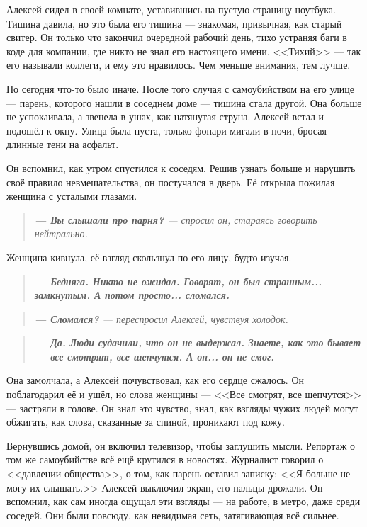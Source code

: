 \documentclass[12pt,a4paper]{book}
\newenvironment{dialogue}{\begin{quote}\itshape}{\end{quote}} %
\begin{document}
Алексей сидел в своей комнате, уставившись на пустую страницу ноутбука. Тишина давила, но это была его тишина --- знакомая, привычная, как старый свитер. Он только что закончил очередной рабочий день, тихо устраняя баги в коде для компании, где никто не знал его настоящего имени. <<Тихий>> --- так его называли коллеги, и ему это нравилось. Чем меньше внимания, тем лучше.

Но сегодня что-то было иначе. После того случая с самоубийством на его улице --- парень, которого нашли в соседнем доме --- тишина стала другой. Она больше не успокаивала, а звенела в ушах, как натянутая струна. Алексей встал и подошёл к окну. Улица была пуста, только фонари мигали в ночи, бросая длинные тени на асфальт.

Он вспомнил, как утром спустился к соседям. Решив узнать больше и нарушить своё правило невмешательства, он постучался в дверь. Её открыла пожилая женщина с усталыми глазами.

\begin{dialogue}
\textbf{--- Вы слышали про парня?} --- спросил он, стараясь говорить нейтрально.
\end{dialogue}

Женщина кивнула, её взгляд скользнул по его лицу, будто изучая.

\begin{dialogue}
\textbf{--- Бедняга. Никто не ожидал. Говорят, он был странным... замкнутым. А потом просто... сломался.}
\end{dialogue}

\begin{dialogue}
\textbf{--- Сломался?} --- переспросил Алексей, чувствуя холодок.
\end{dialogue}

\begin{dialogue}
\textbf{--- Да. Люди судачили, что он не выдержал. Знаете, как это бывает --- все смотрят, все шепчутся. А он... он не смог.}
\end{dialogue}

Она замолчала, а Алексей почувствовал, как его сердце сжалось. Он поблагодарил её и ушёл, но слова женщины --- <<Все смотрят, все шепчутся>> --- застряли в голове. Он знал это чувство, знал, как взгляды чужих людей могут обжигать, как слова, сказанные за спиной, проникают под кожу.

Вернувшись домой, он включил телевизор, чтобы заглушить мысли. Репортаж о том же самоубийстве всё ещё крутился в новостях. Журналист говорил о <<давлении общества>>, о том, как парень оставил записку: <<Я больше не могу их слышать.>> Алексей выключил экран, его пальцы дрожали. Он вспомнил, как сам иногда ощущал эти взгляды --- на работе, в метро, даже среди соседей. Они были повсюду, как невидимая сеть, затягивающая всё сильнее.
\end{document}
